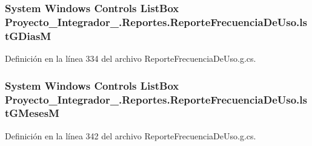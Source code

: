 \hypertarget{class_proyecto___integrador__3_1_1_reportes_1_1_reporte_frecuencia_de_uso_a53386efc7578719e8fa049b5b2540f66}{
\subsubsection[{lst\-G\-Dias\-M}]{\setlength{\rightskip}{0pt plus 5cm}System Windows Controls List\-Box Proyecto\-\_\-\-Integrador\-\_.\-Reportes.\-Reporte\-Frecuencia\-De\-Uso.\-lst\-G\-Dias\-M\hspace{0.3cm}{\ttfamily [package]}}}\label{class_proyecto___integrador__3_1_1_reportes_1_1_reporte_frecuencia_de_uso_a53386efc7578719e8fa049b5b2540f66}


Definición en la línea 334 del archivo Reporte\-Frecuencia\-De\-Uso.\-g.\-cs.

\hypertarget{class_proyecto___integrador__3_1_1_reportes_1_1_reporte_frecuencia_de_uso_a8c5a6768727a54835e71fce7e83a1392}{
\subsubsection[{lst\-G\-Meses\-M}]{\setlength{\rightskip}{0pt plus 5cm}System Windows Controls List\-Box Proyecto\-\_\-\-Integrador\-\_.\-Reportes.\-Reporte\-Frecuencia\-De\-Uso.\-lst\-G\-Meses\-M\hspace{0.3cm}{\ttfamily [package]}}}\label{class_proyecto___integrador__3_1_1_reportes_1_1_reporte_frecuencia_de_uso_a8c5a6768727a54835e71fce7e83a1392}


Definición en la línea 342 del archivo Reporte\-Frecuencia\-De\-Uso.\-g.\-cs.


